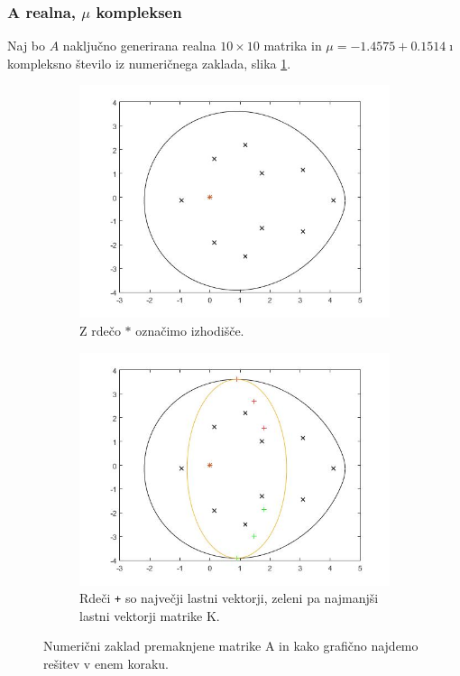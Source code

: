 \documentclass[12pt,a4paper]{amsart}
\theoremstyle{definition}
\theoremstyle{plain}
\begin{document}
\subsubsection{A realna, $\mu$ kompleksen}


Naj bo $A$ naključno generirana realna $10\times 10$ matrika in $\mu = -1.4575 + 0.1514 \imath$ kompleksno število iz numeričnega zaklada, slika \ref{fig:p31}.

\begin{figure}[H]
\renewcommand*\thesubfigure{\Alph{subfigure}}
\begin{subfigure}[t]{0.5\textwidth}
\includegraphics[width=0.9\linewidth]{RC1.jpg}
\caption{Z rdečo $\ast$ označimo izhodišče.}
\label{fig:p31}
\end{subfigure}%
\hfill
\begin{subfigure}[t]{0.5\textwidth}
\includegraphics[width=0.9\linewidth]{RC1e.jpg}
\caption{Rdeči \verb~+~ so največji lastni vektorji, zeleni pa najmanjši lastni vektorji matrike K.\footnotemark}
\end{subfigure}
\caption{Numerični zaklad premaknjene matrike A in kako grafično najdemo rešitev v enem koraku.}

\end{figure}
\end{document}
